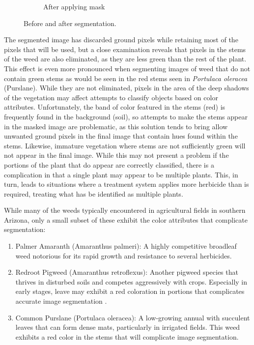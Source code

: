 \documentclass[letterpaper]{report}
\begin{document}
{\begin{figure}[H]
\begin{subfigure}[h]{.30\textwidth}
	  \caption{After applying mask}
	  \label{fig:original-masked}
	\end{subfigure}
	\caption[Before and after segmentation]{Before and after segmentation.}
	\label{fig:segmentation}
\end{figure}
The segmented image has discarded ground pixels while retaining most of the pixels that will be used, but a close examination reveals that pixels in the stems of the weed are also eliminated, as they are less green than the rest of the plant. This effect is even more pronounced when segmenting images of weed that do not contain green stems as would be seen in the red stems seen in \textit{Portulaca oleracea} (Purslane). While they are not eliminated, pixels in the area of the deep shadows of the vegetation may affect attempts to classify objects based on color attributes. Unfortunately, the band of color featured in the stems (red) is frequently found in the background (soil), so attempts to make the stems appear in the masked image are problematic, as this solution tends to bring allow unwanted ground pixels in the final image that contain hues found within the stems. Likewise, immature vegetation where stems are not sufficiently green will not appear in the final image.  While this may not present a problem if the portions of the plant that do appear are correctly classified, there is a complication in that a single plant may appear to be multiple plants. This, in turn, leads to situations where a treatment system applies more herbicide than is required, treating what has be identified as multiple plants.

While many of the weeds typically encountered in agricultural fields in southern Arizona, only a small subset of these exhibit the color attributes that complicate segmentation:
\begin{enumerate}
	\item{Palmer Amaranth (Amaranthus palmeri): A highly competitive broadleaf weed notorious for its rapid growth and resistance to several herbicides.}

	\item{Redroot Pigweed (Amaranthus retroflexus): Another pigweed species that thrives in disturbed soils and competes aggressively with crops. Especially in early stages, leave may exhibit a red coloration in portions that complicates accurate image segmentation \parencite{Sosnoskie2018-ye}.}

	\item{Common Purslane (Portulaca oleracea): A low-growing annual with succulent leaves that can form dense mats, particularly in irrigated fields. This weed exhibits a red color in the stems that will complicate image segmentation.}


\end{enumerate}}
\end{document}
